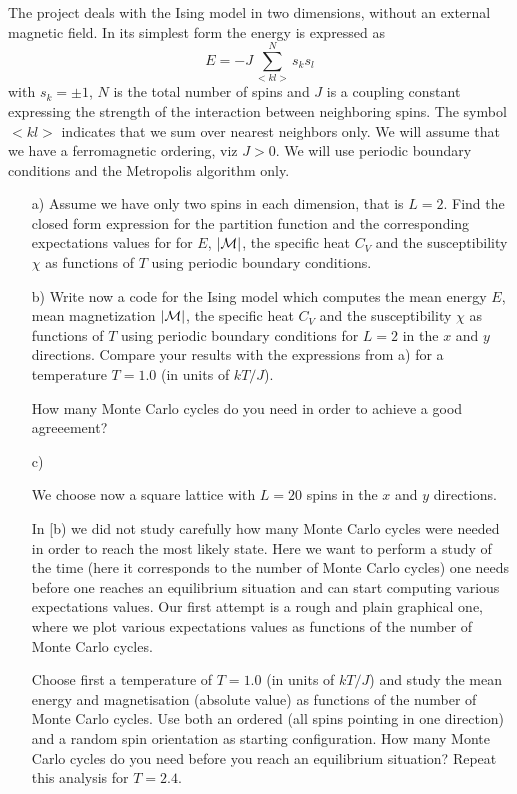 \documentclass[11pt,a4wide]{article}
\begin{document}
The project deals with the Ising model in two dimensions, without an external magnetic 
field. In its simplest form
the energy is expressed as
\begin{equation}
  E=-J\sum_{<kl>}^{N}s_ks_l
\end{equation}
with  $s_k=\pm 1$, $N$ is the total number of spins and
$J$ is a coupling constant expressing the strength of the interaction
between neighboring spins.
The symbol $<kl>$ indicates that we sum over nearest
neighbors only. We will assume that we have a ferromagnetic ordering, viz $J> 0$.
We will use periodic boundary conditions and the Metropolis algorithm only. 
\begin{enumerate}

\item[a)] Assume we have only two spins in each dimension, that is $L=2$.
Find the closed form expression for the partition function and the corresponding
expectations values for
for $E$, $|{\cal M}|$, the specific heat $C_V$ and the susceptibility $\chi$ 
as functions of  $T$ using periodic boundary conditions.



\item[b)] 
Write now a code for the Ising model which computes the mean energy 
$E$, mean magnetization 
$|{\cal M}|$, the specific heat $C_V$ and the susceptibility $\chi$ 
as functions of  $T$ using periodic boundary conditions for 
$L=2$ in the $x$ and $y$ directions. 
Compare your results with the expressions from a)
for  a  temperature $T=1.0$ (in units of $kT/J$). 

How many Monte Carlo cycles do you need in order to achieve a good agreeement?


\item[c)]
 
We choose now a square lattice with $L=20$ spins in the $x$ and $y$ directions. 

In [b) we did not study carefully how many Monte Carlo cycles were needed in order to reach the most likely state. Here
we want to perform a study of the time (here it corresponds to the number 
of Monte Carlo cycles) one needs before one reaches an equilibrium situation 
and can start computing various expectations values. Our 
first attempt is a rough and plain graphical
one, where we plot various expectations values as functions of the number of Monte Carlo cycles.

Choose first a temperature of $T=1.0$ (in units of $kT/J$) and study the 
mean energy and magnetisation (absolute value) as functions of the number of Monte Carlo cycles.
Use both an ordered (all spins pointing in one direction) and a random
spin orientation as starting configuration. 
How many Monte Carlo cycles do you need before you reach an equilibrium situation?
Repeat this analysis for $T=2.4$. 


\end{enumerate}
\end{document}
